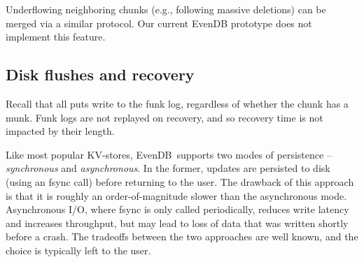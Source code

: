 \documentclass[sigplan,10pt]{acmart}
\newcommand{\code}[1]{\textsf{\fontsize{9}{11}\selectfont #1}}
\newcommand{\remove}[1]{}
\newcommand{\sys}{EvenDB}
\begin{document}
\remove{
In order to guarantee correctness of this multi-step process, we model a chunk's life cycle as a finite state machine, 
depicted by Figure~\ref{fig:chunklife}. A new chunk is created in \emph{baby} state, in which it is immutable. Once added 
to the index, a chunk transitions to \emph{child} state, in which it is mutable but cannot be rebalanced yet. Finally, when 
a chunk gets its own funk it becomes \emph{active} -- i.e., eligible for all operations. A chunk that has been split into 
two new chunks becomes \emph{aged} -- a state in which it remains immutable but can serve the gets and the scans 
that are concurrently accessing it via the index. Once it gets removed from the chunk list and has no outstanding
reads, it can be disposed. 
}

Underflowing neighboring chunks (e.g., following massive deletions) can be merged via a similar protocol. 
Our current \sys\/ prototype does not implement this feature. 

\subsection{Disk flushes and recovery}
\label{ssec:flush-recovery}

Recall that all puts write to the funk log, regardless of whether the chunk has a munk. 
Funk logs are not replayed on recovery, and so recovery time is not impacted by 
their length.

Like most popular KV-stores, \sys\ supports two modes of persistence -- \emph{synchronous} and \emph{asynchronous}. 
In the former,  updates are persisted to disk (using an \code{fsync} call)
before returning to the user. %
The drawback of this approach is that it is roughly an order-of-magnitude slower than the asynchronous mode.
Asynchronous I/O, where \code{fsync} is only called periodically, 
reduces write latency and increases throughput, but 
may lead to loss of data that was written shortly before a crash. The tradeoffs between the two approaches are 
well known, and the choice is typically left to the user.
\end{document}
